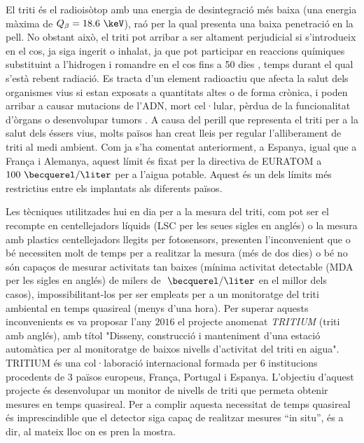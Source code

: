 El triti és el radioisòtop amb una energia de desintegració més baixa (una energia màxima de $Q_\beta=18.6~\keV$), raó per la qual presenta una baixa penetració en la pell. No obstant això, el triti pot arribar a ser altament perjudicial si s'introdueix en el cos, ja siga ingerit o inhalat, ja que pot participar en reaccions químiques substituint a l'hidrogen i romandre en el cos fins a 50 dies \cite{EstimationTritiumDosiKangarooRats, TissueDistribution}, temps durant el qual s'està rebent radiació. Es tracta d'un element radioactiu que afecta la salut dels organismes vius si estan exposats a quantitats altes o de forma crònica, i poden arribar a causar mutacions de l'ADN, mort cel·lular, pèrdua de la funcionalitat d'òrgans o desenvolupar tumors \cite{StraumeTritiumHazard}. A causa del perill que representa el triti per a la salut dels éssers vius, molts països han creat lleis per regular l'alliberament de triti al medi ambient. Com ja s'ha comentat anteriorment, a Espanya, igual que a França i Alemanya, aquest límit és fixat per la directiva de EURATOM a $100~\becquerel/\liter$ per a l'aigua potable. Aquest és un dels límits més restrictius entre els implantats als diferents països.

Les tècniques utilitzades hui en dia per a la mesura del triti, com pot ser el recompte en centellejadors líquids (LSC per les seues sigles en anglés) o la mesura amb plastics centellejadors llegits per fotosensors, presenten l'inconvenient que o bé necessiten molt de temps per a realitzar la mesura (més de dos dies) o bé no són capaços de mesurar activitats tan baixes (mínima activitat detectable (MDA per les sigles en anglés) de milers de $~\becquerel/\liter$ en el millor dels casos), impossibilitant-los per ser empleats per a un monitoratge del triti ambiental en temps quasireal (menys d'una hora). Per superar aquests inconvenients es va proposar l'any $2016$ el projecte anomenat \textit{TRITIUM} (triti amb anglés), amb títol "Disseny, construcció i manteniment d'una estació automàtica per al monitoratge de baixos nivells d'activitat del triti en aigua". TRITIUM és una col·laboració internacional formada per $6$ institucions procedents de $3$ països europeus, França, Portugal i Espanya. L'objectiu d'aquest projecte és desenvolupar un monitor de nivells de triti que permeta obtenir mesures en temps quasireal. Per a complir aquesta necessitat de temps quasireal és imprescindible que el detector siga capaç de realitzar mesures ``in situ'', és a dir, al mateix lloc on es pren la mostra.

